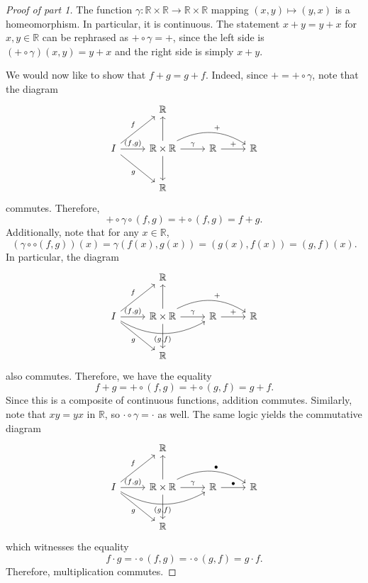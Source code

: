 \documentclass[11pt, letterpaper]{article}
\theoremstyle{plain}
\begin{document}
\begin{proof}[Proof of part 1]
	The function $\gamma : \mathbb{R} \times \mathbb{R}  \to \mathbb{R} \times \mathbb{R} $ mapping $(x,y)\mapsto (y,x)$ is a homeomorphism. In particular, it is continuous. The statement $x+y=y+x$ for $x,y\in \mathbb{R} $ can be rephrased as $+\circ \gamma =+$, since the left side is $(+\circ \gamma )(x,y)=y+x$ and the right side is simply $x+y$.

	We would now like to show that $f+g=g+f$. Indeed, since $+=+\circ \gamma $, note that the diagram
	\[\begin{tikzcd}[row sep = 2.5em, column sep = 2.5em]
	 &  \mathbb{R}  &  \\
		I \ar[" f ", ur] \ar[" g "', dr] \ar[" (f\text{,} g) ", r]  & \mathbb{R} \times \mathbb{R} \ar[u] \ar[d] \ar[" \gamma  ", r] \ar[" + ", bend left, rr]  & \mathbb{R} \ar[" + ", r] & \mathbb{R}  \\
	 &  \mathbb{R}  & 
	\end{tikzcd}\]
	commutes. Therefore,
	\[
		+\circ \gamma \circ (f,g)=+\circ (f,g)=f+g
	.\]
	Additionally, note that for any $x\in\mathbb{R} $,
	\[
		(\gamma \circ \circ (f,g))(x)=\gamma (f(x),g(x))=(g(x),f(x))=(g,f)(x)
	.\]
	In particular, the diagram
	\[\begin{tikzcd}[row sep = 2.5em, column sep = 2.5em]
	 &  \mathbb{R}  &  \\
		I \ar[" f ", ur] \ar[" g "', dr]\ar[" (g\text{,} f) "', bend right, rr] \ar[" (f\text{,} g) ", r]  & \mathbb{R} \times \mathbb{R} \ar[u] \ar[d] \ar[" \gamma  ", r] \ar[" + ", bend left, rr]  & \mathbb{R} \ar[" +  ", r] & \mathbb{R}  \\
	 &  \mathbb{R}  & 
	\end{tikzcd}\]
	also commutes. Therefore, we have the equality
	\[
		f+g=+\circ (f,g)=+\circ (g,f)=g+f
	.\]
	Since this is a composite of continuous functions, addition commutes. Similarly, note that $xy=yx$ in $\mathbb{R} $, so $\cdot \circ \gamma =\cdot $ as well. The same logic yields the commutative diagram
	\[\begin{tikzcd}[row sep = 2.5em, column sep = 2.5em]
	 &  \mathbb{R}  &  \\
		I \ar[" f ", ur] \ar[" g "', dr]\ar[" (g\text{,} f) "', bend right, rr] \ar[" (f\text{,} g) ", r]  & \mathbb{R} \times \mathbb{R} \ar[u] \ar[d] \ar[" \gamma  ", r] \ar[" \bullet ", bend left, rr]  & \mathbb{R} \ar[" \bullet  ", r] & \mathbb{R}  \\
	 &  \mathbb{R}  & 
	\end{tikzcd}\]
	which witnesses the equality
	\[
		f\cdot g=\cdot \circ (f,g)=\cdot \circ (g,f)=g\cdot f
	.\]
	Therefore, multiplication commutes.


\end{proof}
\end{document}
